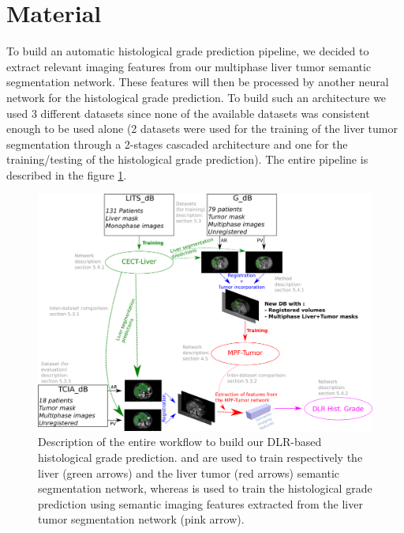 \section{Material}


To build an automatic histological grade prediction pipeline, we decided to extract relevant imaging features from our multiphase liver tumor semantic segmentation network. These features will then be processed by another neural network for the histological grade prediction. To build such an architecture we used 3 different datasets since none of the available datasets was consistent enough to be used alone (2 datasets were used for the training of the liver tumor segmentation through a 2-stages cascaded architecture and one for the training/testing of the histological grade prediction). The entire pipeline is described in the figure \ref{fig:DLR_pipeline_withDB}.
\begin{figure}[ht!]
	\centering
	\includegraphics[width=0.9\linewidth]{../HistologicalGradePrediction/images/DLR_pipeline_withDB}
	\caption{Description of the entire workflow to build our DLR-based histological grade prediction. \textbf{} and \textbf{} are used to train respectively the liver (green arrows) and the liver tumor (red arrows) semantic segmentation network, whereas \textbf{} is used to train the histological grade prediction using semantic imaging features extracted from the liver tumor segmentation network (pink arrow).}
	\label{fig:DLR_pipeline_withDB}
\end{figure}
